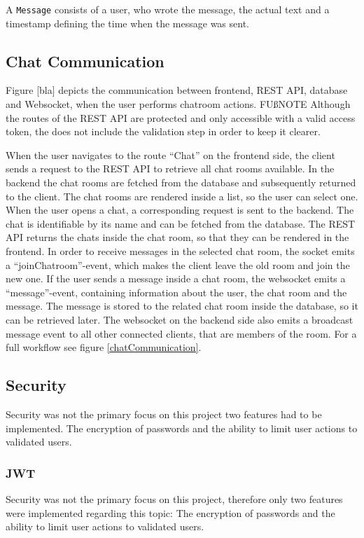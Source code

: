 A  \texttt{Message} consists of a user, who wrote the message, the actual text and a timestamp defining the time when the message was sent.

\subsection{Chat Communication}
Figure [bla] depicts the communication between frontend, REST API, database and Websocket, when the user performs chatroom actions.
FUßNOTE Although the routes of the REST API are protected and only accessible with a valid access token, the  does not include the validation step in order to keep it clearer. 

When the user navigates  to the route “Chat” on the frontend side, the client sends a request to the REST API to retrieve all chat rooms available. In the backend the chat rooms are fetched from the database and subsequently returned to the client.
The chat rooms are rendered inside a list, so the user can select one.
When the user opens a chat, a corresponding request is sent to the backend. The chat is identifiable by its name and can be fetched from the database.
The REST API returns the chats inside the chat room, so that they can be rendered in the frontend.
In order to receive messages in the selected chat room, the socket emits a “joinChatroom”-event, which makes the client leave the old room and join the new one.
If the user sends a message inside a chat room, the websocket emits a “message”-event, containing information about the user, the chat room and the message. 
The message is stored to the related chat room inside the database, so it can be retrieved later.
The websocket on the backend side also emits a broadcast message event to all other connected clients, that are members of the room. For a full workflow see figure \ref{chatCommunication}.


\subsection{Security}
Security was not the primary focus on this project two features had to be implemented. The encryption of passwords and the ability to limit user actions to validated users. 
\subsubsection{JWT}
Security was not the primary focus on this project, therefore only two features were implemented regarding this topic: The encryption of passwords and the ability to limit user actions to validated users.
